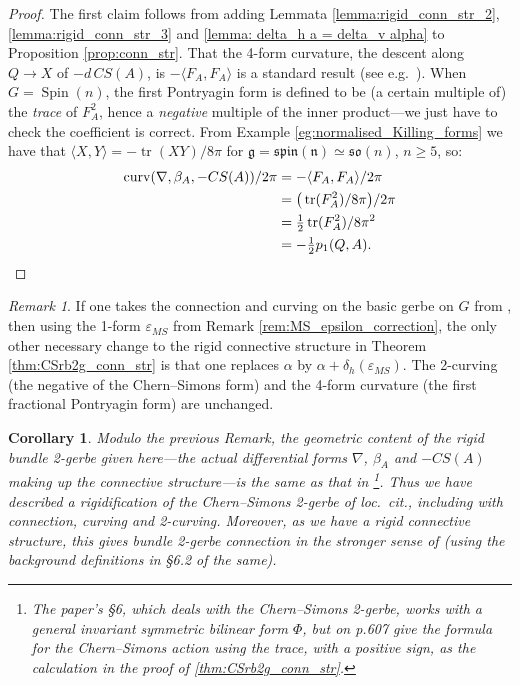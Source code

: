 \documentclass[12pt]{amsart}
\DeclareMathOperator{\tr}{tr}
\DeclareMathOperator{\Spin}{Spin}
\theoremstyle{plain}
\newtheorem{corollary}[theorem]{Corollary}
\theoremstyle{definition}
\theoremstyle{remark}
\newtheorem{remark}[theorem]{Remark}
\numberwithin{equation}{section}
\newcommand{\fg}{\mathfrak g}
\DeclareMathOperator{\curv}{curv}
\newcommand{\<}{\langle}
\renewcommand{\>}{\rangle}
\begin{document}
\begin{proof}
The first claim follows from adding Lemmata \ref{lemma:rigid_conn_str_2}, \ref{lemma:rigid_conn_str_3} and \ref{lemma: delta_h a = delta_v alpha} to Proposition \ref{prop:conn_str}.
That the 4-form curvature, the descent along $Q\to X$ of $-d\,CS(A)$, is $-\langle F_A,F_A\rangle$ is a standard result (see e.g.\ \cite[Proposition 1.27]{Freed_95}). When $G=\Spin(n)$, the first Pontryagin form is defined to be (a certain multiple of) the \emph{trace} of $F_A^2$, hence a \emph{negative} multiple of the inner product---we just have to check the coefficient is correct. From Example \ref{eg:normalised_Killing_forms} we have that $\langle X,Y\rangle = -\tr(XY)/8\pi$ for $\fg = \mathfrak{spin(n)} \simeq \mathfrak{so}(n)$, $n\geq 5$, so:
\begin{align*}
\curv(\nabla,\beta_A,-CS(A))/2\pi &= -\langle F_A,F_A\rangle/2\pi \\
&= \big(\tr(F_A^2)/8\pi\big)/2\pi \\
& = \tfrac{1}{2}\tr(F_A^2)/8\pi^2\\
& = -\tfrac{1}{2}p_1(Q,A). \qedhere
\end{align*}
\end{proof}




\begin{remark}
If one takes the connection and curving on the basic gerbe on $G$ from \cite{MS03}, then using the 1-form $\varepsilon_{MS}$ from Remark \ref{rem:MS_epsilon_correction}, the only other necessary change to the rigid connective structure in Theorem \ref{thm:CSrb2g_conn_str} is that one replaces $\alpha$ by $\alpha + \delta_h(\varepsilon_{MS})$.
The 2-curving (the negative of the Chern--Simons form) and the 4-form curvature (the first fractional Pontryagin form) are unchanged.
\end{remark}

\begin{corollary}\label{cor:CSrb2g_rigidification_with_geom}
Modulo the previous Remark, the geometric content of the rigid bundle 2-gerbe given here---the \emph{actual differential forms} $\nabla$, $\beta_A$ and $-CS(A)$ making up the connective structure---is the same as that in \cite{CJMSW}\footnote{The paper's \S6, which deals with the Chern--Simons 2-gerbe, works with a general invariant symmetric bilinear form $\Phi$, but on p.607 give the formula for the Chern--Simons action using the trace, with a positive sign, as the calculation in the proof of \ref{thm:CSrb2g_conn_str}.}. 
Thus we have described a rigidification of the Chern--Simons 2-gerbe of \emph{loc.\ cit.}, including with connection, curving and 2-curving. 
Moreover, as we have a \emph{rigid} connective structure, this gives bundle 2-gerbe connection in the stronger sense of \cite[Definition 4.1]{Wal} (using the background definitions in \S 6.2 of the same).
\end{corollary}
\end{document}
